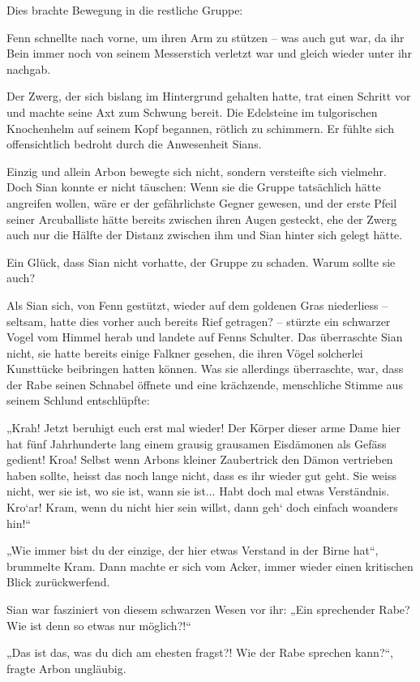 \documentclass[10pt, a4paper, oneside]{book}
\begin{document}
Dies brachte Bewegung in die restliche Gruppe: 

Fenn schnellte nach vorne, um ihren Arm zu stützen – was auch gut war, da ihr Bein immer noch von seinem Messerstich verletzt war und gleich wieder unter ihr nachgab. 

Der Zwerg, der sich bislang im Hintergrund gehalten hatte, trat einen Schritt vor und machte seine Axt zum Schwung bereit. Die Edelsteine im tulgorischen Knochenhelm auf seinem Kopf begannen, rötlich zu schimmern. Er fühlte sich offensichtlich bedroht durch die Anwesenheit Sians.

Einzig und allein Arbon bewegte sich nicht, sondern versteifte sich vielmehr. Doch Sian konnte er nicht täuschen: Wenn sie die Gruppe tatsächlich hätte angreifen wollen, wäre er der gefährlichste Gegner gewesen, und der erste Pfeil seiner Arcuballiste hätte bereits zwischen ihren Augen gesteckt, ehe der Zwerg auch nur die Hälfte der Distanz zwischen ihm und Sian hinter sich gelegt hätte.

Ein Glück, dass Sian nicht vorhatte, der Gruppe zu schaden. Warum sollte sie auch?

Als Sian sich, von Fenn gestützt, wieder auf dem goldenen Gras niederliess – seltsam, hatte dies vorher auch bereits Rief getragen? – stürzte ein schwarzer Vogel vom Himmel herab und landete auf Fenns Schulter. Das überraschte Sian nicht, sie hatte bereits einige Falkner gesehen, die ihren Vögel solcherlei Kunsttücke beibringen hatten können. Was sie allerdings überraschte, war, dass der Rabe seinen Schnabel öffnete und eine krächzende, menschliche Stimme aus seinem Schlund entschlüpfte:

„Krah! Jetzt beruhigt euch erst mal wieder! Der Körper dieser arme Dame hier hat fünf Jahrhunderte lang einem grausig grausamen Eisdämonen als Gefäss gedient! Kroa! Selbst wenn Arbons kleiner Zaubertrick den Dämon vertrieben haben sollte, heisst das noch lange nicht, dass es ihr wieder gut geht. Sie weiss nicht, wer sie ist, wo sie ist, wann sie ist... Habt doch mal etwas Verständnis. Kro‘ar! Kram, wenn du nicht hier sein willst, dann geh‘ doch einfach woanders hin!“

„Wie immer bist du der einzige, der hier etwas Verstand in der Birne hat“, brummelte Kram. Dann machte er sich vom Acker, immer wieder einen kritischen Blick zurückwerfend.

Sian war fasziniert von diesem schwarzen Wesen vor ihr: „Ein sprechender Rabe? Wie ist denn so etwas nur möglich?!“

„Das ist das, was du dich am ehesten fragst?! Wie der Rabe sprechen kann?“, fragte Arbon ungläubig.
\end{document}
